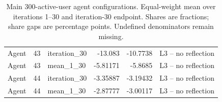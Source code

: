 \begin{table}[htbp!]
\begin{tabular}{lrlrrl}
Agent & 43 & iteration\_30 & -13.083 & -10.7738 & L3 -- no reflection \\
Agent & 43 & mean\_1\_30 & -5.81171 & -5.8685 & L3 -- no reflection \\
Agent & 44 & iteration\_30 & -3.35887 & -3.19432 & L3 -- no reflection \\
Agent & 44 & mean\_1\_30 & -2.87777 & -3.00117 & L3 -- no reflection \\
\hline
\end{tabular}
\caption{Main 300-active-user agent configurations. Equal-weight mean over iterations 1--30 and iteration-30 endpoint. Shares are fractions; share gaps are percentage points. Undefined denominators remain missing.}
\label{chap:results:tab:rq3_agents_selection}
\end{table}

